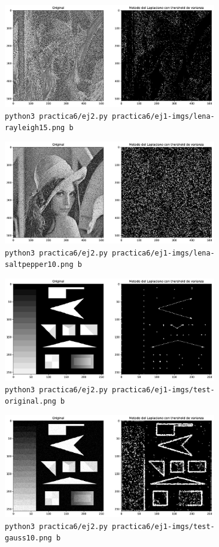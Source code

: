\documentclass[11pt, spanish]{article}
\begin{document}
\begin{figure}[H]
\centering
    \includegraphics[height=4.5cm]{informe-imgs/ej2-b-lena-rayleigh15.jpg}
    \caption{\texttt{python3 practica6/ej2.py practica6/ej1-imgs/lena-rayleigh15.png b}}
\end{figure}

\begin{figure}[H]
\centering
    \includegraphics[height=4.5cm]{informe-imgs/ej2-b-lena-saltpepper10.jpg}
    \caption{\texttt{python3 practica6/ej2.py practica6/ej1-imgs/lena-saltpepper10.png b}}
\end{figure}


\begin{figure}[H]
\centering
    \includegraphics[height=4.5cm]{informe-imgs/ej2-b-test-original.jpg}
    \caption{\texttt{python3 practica6/ej2.py practica6/ej1-imgs/test-original.png b}}
\end{figure}

\begin{figure}[H]
\centering
    \includegraphics[height=4.5cm]{informe-imgs/ej2-b-test-gauss10.jpg}
    \caption{\texttt{python3 practica6/ej2.py practica6/ej1-imgs/test-gauss10.png b}}
\end{figure}
\end{document}
